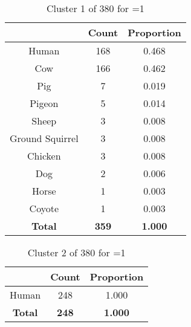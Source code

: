 \begin{table}[ht!]
\centering
\begin{tabular}{|c|c|c|}
\hline
\bf \Spec{} &\bf Count &\bf Proportion\\ \hline \hline
Human & 168 & 0.468\\ \hline
Cow & 166 & 0.462\\ \hline
Pig & 7 & 0.019\\ \hline
Pigeon & 5 & 0.014\\ \hline
Sheep & 3 & 0.008\\ \hline
Ground Squirrel & 3 & 0.008\\ \hline
Chicken & 3 & 0.008\\ \hline
Dog & 2 & 0.006\\ \hline
Horse & 1 & 0.003\\ \hline
Coyote & 1 & 0.003\\ \hline
\hline
\bf Total & \bf 359 & \bf 1.000\\ \hline
\end{tabular}
\label{tab:cluster:1:1}
\caption{Cluster 1 of 380 for \minneigh{}=1}
\end{table}

\begin{table}[ht!]
\centering
\begin{tabular}{|c|c|c|}
\hline
\bf \Spec{} &\bf Count &\bf Proportion\\ \hline \hline
Human & 248 & 1.000\\ \hline
\hline
\bf Total & \bf 248 & \bf 1.000\\ \hline
\end{tabular}
\label{tab:cluster:2:1}
\caption{Cluster 2 of 380 for \minneigh{}=1}
\end{table}


